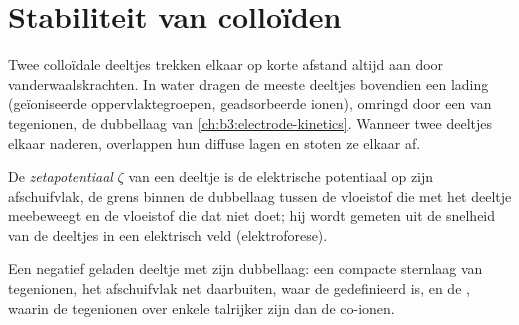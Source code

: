 \section{Stabiliteit van colloïden}

Twee colloïdale deeltjes trekken elkaar op korte afstand altijd aan door
vanderwaalskrachten. In water dragen de meeste deeltjes bovendien een
lading (geïoniseerde oppervlaktegroepen, geadsorbeerde ionen), omringd
door een  van tegenionen, de dubbellaag van
\cref{ch:b3:electrode-kinetics}. Wanneer twee deeltjes elkaar naderen,
overlappen hun diffuse lagen en stoten ze elkaar af.

\begin{definition}[Zetapotentiaal]\label{def:b3:colloids:zeta}
De \emph{zetapotentiaal} $\zeta$ van een deeltje is
de elektrische potentiaal op zijn afschuifvlak, de grens binnen de
dubbellaag tussen de vloeistof die met het deeltje meebeweegt en de
vloeistof die dat niet doet; hij wordt gemeten uit de snelheid van de
deeltjes in een elektrisch veld (elektroforese).
\end{definition}

\begin{omfigure}

{\small Een negatief geladen deeltje met zijn dubbellaag: een compacte
sternlaag van tegenionen, het afschuifvlak net daarbuiten, waar de
 gedefinieerd is, en de , waarin de tegenionen
over enkele  talrijker zijn dan de co-ionen.}
\end{omfigure}

